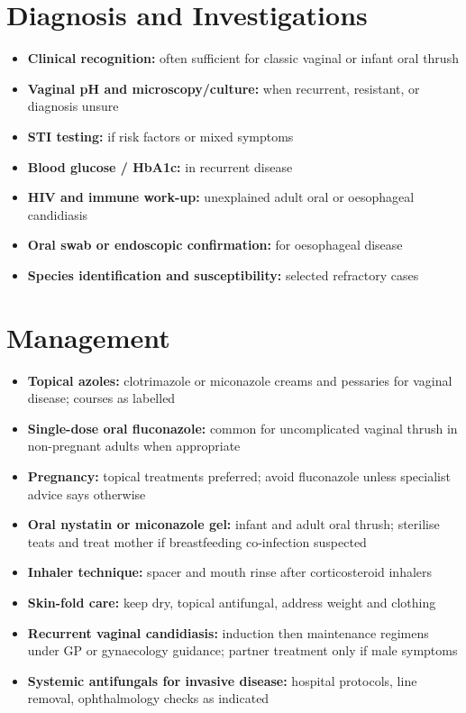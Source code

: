 \section*{Diagnosis and Investigations}
\begin{itemize}
    \item \textbf{Clinical recognition:} often sufficient for classic vaginal or infant oral thrush
    \item \textbf{Vaginal pH and microscopy/culture:} when recurrent, resistant, or diagnosis unsure
    \item \textbf{STI testing:} if risk factors or mixed symptoms
    \item \textbf{Blood glucose / HbA1c:} in recurrent disease
    \item \textbf{HIV and immune work-up:} unexplained adult oral or oesophageal candidiasis
    \item \textbf{Oral swab or endoscopic confirmation:} for oesophageal disease
    \item \textbf{Species identification and susceptibility:} selected refractory cases
\end{itemize}

\section*{Management}
\begin{itemize}
    \item \textbf{Topical azoles:} clotrimazole or miconazole creams and pessaries for vaginal disease; courses as labelled
    \item \textbf{Single-dose oral fluconazole:} common for uncomplicated vaginal thrush in non-pregnant adults when appropriate
    \item \textbf{Pregnancy:} topical treatments preferred; avoid fluconazole unless specialist advice says otherwise
    \item \textbf{Oral nystatin or miconazole gel:} infant and adult oral thrush; sterilise teats and treat mother if breastfeeding co-infection suspected
    \item \textbf{Inhaler technique:} spacer and mouth rinse after corticosteroid inhalers
    \item \textbf{Skin-fold care:} keep dry, topical antifungal, address weight and clothing
    \item \textbf{Recurrent vaginal candidiasis:} induction then maintenance regimens under GP or gynaecology guidance; partner treatment only if male symptoms
    \item \textbf{Systemic antifungals for invasive disease:} hospital protocols, line removal, ophthalmology checks as indicated
\end{itemize}

